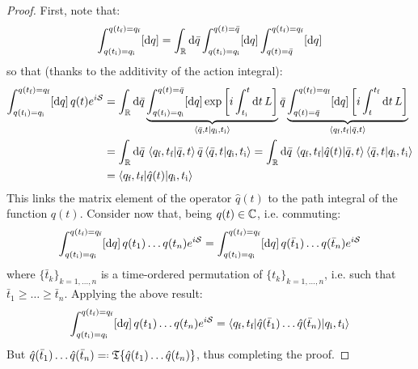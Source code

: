 \begin{proofbox}
  \begin{proof}
    First, note that:
    \begin{equation*}
      \int_{q(t_\text{i}) = q_\text{i}}^{q(t_\text{f}) = q_\text{f}} [\mathrm{d} q] = \int_{\mathbb{R}} \mathrm{d}\bar{q} \int_{q(t_\text{i}) = q_\text{i}}^{q(t) = \bar{q}} [\mathrm{d} q] \int_{q(t) = \bar{q}}^{q(t_\text{f}) = q_\text{f}} [\mathrm{d} q]
    \end{equation*}
    so that (thanks to the additivity of the action integral):
    \begin{equation*}
      \begin{split}
        \int_{q(t_\text{i}) = q_\text{i}}^{q(t_\text{f}) = q_\text{f}} [\mathrm{d} q]\, q(t) e^{i \mathcal{S}}
        & = \int_{\mathbb{R}} \mathrm{d}\bar{q} \underbrace{\int_{q(t_\text{i}) = q_\text{i}}^{q(t) = \bar{q}} [\mathrm{d} q] \exp \left[ i \int_{t_\text{i}}^t \mathrm{d} t\, L \right]}_{\braket{\bar{q},t | q_\text{i},t_\text{i}}} \bar{q} \underbrace{\int_{q(t) = \bar{q}}^{q(t_\text{f}) = q_\text{f}} [\mathrm{d} q] \left[ i \int_t^{t_\text{f}} \mathrm{d} t\, L \right]}_{\braket{q_\text{f},t_\text{f} | \bar{q},t}} \\
        & = \int_{\mathbb{R}} \mathrm{d}\bar{q}\, \braket{q_\text{f},t_\text{f} | \bar{q},t} \bar{q} \braket{\bar{q},t | q_\text{i},t_\text{i}} = \int_{\mathbb{R}} \mathrm{d}\bar{q}\, \braket{q_\text{f},t_\text{f} | \hat{q}(t) | \bar{q},t} \braket{\bar{q},t | q_\text{i},t_\text{i}} \\
        & = \braket{q_\text{f},t_\text{f} | \hat{q}(t) | q_\text{i},t_\text{i}}
      \end{split}
    \end{equation*}
    This links the matrix element of the operator $ \hat{q}(t) $ to the path integral of the function $ q(t) $. Consider now that, being $ q(t) \in \mathbb{C} $, i.e. commuting:
    \begin{equation*}
      \int_{q(t_\text{i}) = q_\text{i}}^{q(t_\text{f}) = q_\text{f}} [\mathrm{d} q]\, q(t_1) \dots q(t_n) e^{i \mathcal{S}} = \int_{q(t_\text{i}) = q_\text{i}}^{q(t_\text{f}) = q_\text{f}} [\mathrm{d} q]\, q(\bar{t}_1) \dots q(\bar{t}_n) e^{i \mathcal{S}}
    \end{equation*}
    where $ \{\bar{t}_k\}_{k = 1, \dots, n} $ is a time-ordered permutation of $ \{t_k\}_{k = 1, \dots, n} $, i.e. such that $ \bar{t}_1 \ge \dots \ge \bar{t}_n $. Applying the above result:
    \begin{equation*}
      \int_{q(t_\text{i}) = q_\text{i}}^{q(t_\text{f}) = q_\text{f}} [\mathrm{d} q]\, q(t_1) \dots q(t_n) e^{i \mathcal{S}} = \braket{q_\text{f},t_\text{f} | \hat{q}(\bar{t}_1) \dots \hat{q}(\bar{t}_n) | q_\text{i},t_\text{i}}
    \end{equation*}
    But $ \hat{q}(\bar{t}_1) \dots \hat{q}(\bar{t}_n) \eqdef \tempord \{\hat{q}(t_1) \dots \hat{q}(t_n)\} $, thus completing the proof.
  \end{proof}
\end{proofbox}











